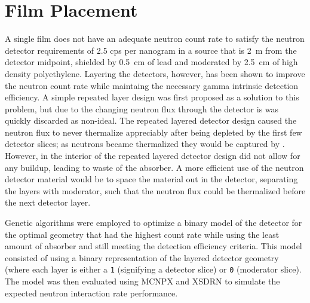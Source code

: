 \section{Film Placement}
A single film does not have an adequate neutron count rate to satisfy the neutron detector requirements of 2.5 cps per nanogram  in a source that is \SI{2}{\m} from the detector midpoint, shielded by \SI{0.5}{\cm} of lead and moderated by \SI{2.5}{\cm} of high density polyethylene.
Layering the detectors, however, has been shown to improve the neutron count rate while maintaing the necessary gamma intrinsic detection efficiency.
A simple repeated layer design was first proposed as a solution to this problem, but due to the changing neutron flux through the detector is was quickly discarded as non-ideal.
The repeated layered detector design caused the neutron flux to never thermalize appreciably after being depleted by the first few detector slices; as neutrons became thermalized they would be captured by .
However, in the interior of the repeated layered detector design did not allow for any buildup, leading to waste of the absorber.
A more efficient use of the neutron detector material would be to space the material out in the detector, separating the layers with moderator, such that the neutron flux could be thermalized before the next detector layer.

Genetic algorithms were employed to optimize a binary model of the detector for the optimal geometry that had the highest count rate while using the least amount of absorber and still meeting the detection efficiency criteria.
This model consisted of using a binary representation of the layered detector geometry (where each layer is either a \verb+1+ (signifying a detector slice) or \verb+0+ (moderator slice).
The model was then evaluated using MCNPX and XSDRN to simulate the expected neutron interaction rate performance.

